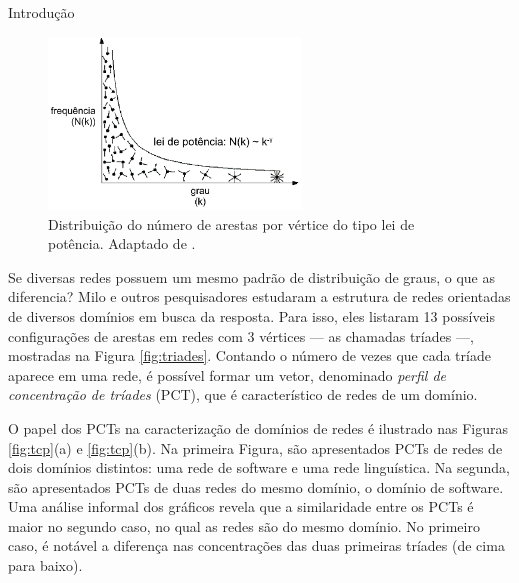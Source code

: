 \begin{section}{Introdução}


\begin{figure}[htbp]
	\centering
	\includegraphics[width=0.6\textwidth]{figuras/leidepotencia}
	\caption{Distribuição do número de arestas por vértice do tipo lei de potência. Adaptado de \cite{Barabasi2007}.}
	\label{fig:leidepotencia}
\end{figure}



Se diversas redes possuem um mesmo padrão de distribuição de graus, o que as diferencia? Milo e outros pesquisadores \cite{Milo2002} estudaram a estrutura de redes orientadas de diversos domínios em busca da resposta. Para isso, eles listaram 13 possíveis configurações de arestas em redes com 3 vértices --- as chamadas tríades ---, mostradas na Figura \ref{fig:triades}. Contando o número de vezes que cada tríade aparece em uma rede, é possível formar um vetor, denominado \emph{perfil de concentração de tríades} (PCT), que é característico de redes de um domínio. 

O papel dos PCTs na caracterização de domínios de redes é ilustrado nas Figuras \ref{fig:tcp}(a) e \ref{fig:tcp}(b). Na primeira Figura, são apresentados PCTs de redes de dois domínios distintos: uma rede de software e uma rede linguística. Na segunda, são apresentados PCTs de duas redes do mesmo domínio, o domínio de software. Uma análise informal dos gráficos revela que a similaridade entre os PCTs é maior no segundo caso, no qual as redes são do mesmo domínio. No primeiro caso, é notável a diferença nas concentrações das duas primeiras tríades (de cima para baixo). 
% 


\end{section}
